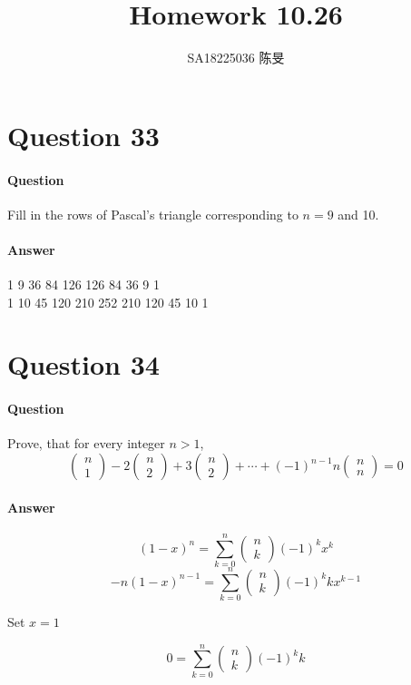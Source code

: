 \documentclass[UTF8]{article}
\title{Homework 10.26}
\author{SA18225036 陈旻}
\begin{document}
\maketitle
\section{Question 33}
\paragraph{Question}
Fill in the rows of Pascal’s triangle corresponding to $n = 9$ and 10.
\paragraph{Answer}
\begin{center}
    1 9 36 84 126 126 84 36 9 1 \\
    1 10 45 120 210 252 210 120 45 10 1 \\
\end{center}
\section{Question 34}
\paragraph{Question}
Prove, that for every integer $n > 1$,
$$\begin{pmatrix} n \\ 1 \end{pmatrix} 
- 2\begin{pmatrix} n \\ 2 \end{pmatrix}
+ 3\begin{pmatrix} n \\ 2 \end{pmatrix}
+ \cdots +
\left( -1\right)^{n-1}n\begin{pmatrix} n \\ n \end{pmatrix}
 = 0
$$
\paragraph{Answer}
$$ \left(1-x\right)^n = \sum_{k=0}^{n}\begin{pmatrix} n \\ k \end{pmatrix} \left(-1\right)^{k} x^{k}$$
$$ -n\left(1-x\right)^{n-1} = \sum_{k=0}^{n}\begin{pmatrix} n \\ k \end{pmatrix} \left(-1\right)^{k} kx^{k-1}$$
\begin{center}
    Set $x = 1$
\end{center}
$$ 0 = \sum_{k=0}^{n}\begin{pmatrix} n \\ k \end{pmatrix} \left(-1\right)^{k} k$$
\end{document}
